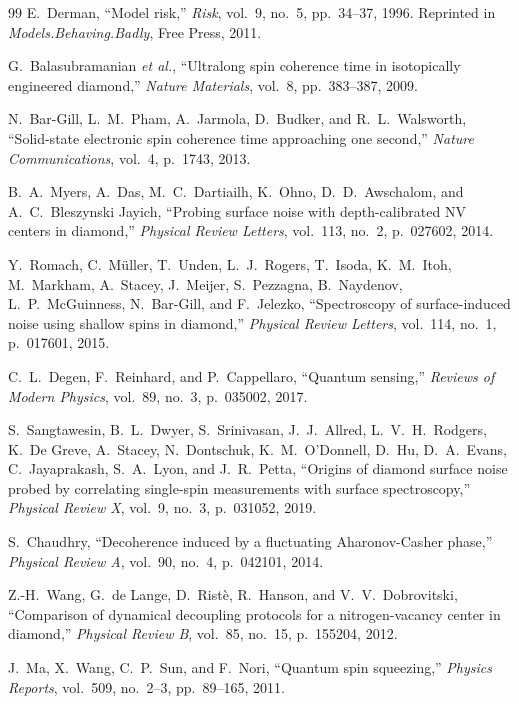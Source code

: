 \documentclass[11pt,a4paper]{article}
\theoremstyle{definition}
\begin{document}
\begin{thebibliography}{99}
E.~Derman, ``Model risk,'' \emph{Risk}, vol.~9, no.~5, pp.~34--37, 1996.
Reprinted in \emph{Models.Behaving.Badly}, Free Press, 2011.

G.~Balasubramanian \emph{et al.}, ``Ultralong spin coherence time in
isotopically engineered diamond,'' \emph{Nature Materials}, vol.~8,
pp.~383--387, 2009.

N.~Bar-Gill, L.~M.~Pham, A.~Jarmola, D.~Budker, and R.~L.~Walsworth,
``Solid-state electronic spin coherence time approaching one second,''
\emph{Nature Communications}, vol.~4, p.~1743, 2013.

B.~A.~Myers, A.~Das, M.~C.~Dartiailh, K.~Ohno, D.~D.~Awschalom, and
A.~C.~Bleszynski Jayich, ``Probing surface noise with depth-calibrated
NV centers in diamond,'' \emph{Physical Review Letters}, vol.~113,
no.~2, p.~027602, 2014.

Y.~Romach, C.~Müller, T.~Unden, L.~J.~Rogers, T.~Isoda, K.~M.~Itoh,
M.~Markham, A.~Stacey, J.~Meijer, S.~Pezzagna, B.~Naydenov,
L.~P.~McGuinness, N.~Bar-Gill, and F.~Jelezko, ``Spectroscopy of
surface-induced noise using shallow spins in diamond,''
\emph{Physical Review Letters}, vol.~114, no.~1, p.~017601, 2015.

C.~L.~Degen, F.~Reinhard, and P.~Cappellaro, ``Quantum sensing,''
\emph{Reviews of Modern Physics}, vol.~89, no.~3, p.~035002, 2017.

S.~Sangtawesin, B.~L.~Dwyer, S.~Srinivasan, J.~J.~Allred,
L.~V.~H.~Rodgers, K.~De Greve, A.~Stacey, N.~Dontschuk,
K.~M.~O'Donnell, D.~Hu, D.~A.~Evans, C.~Jayaprakash,
S.~A.~Lyon, and J.~R.~Petta, ``Origins of diamond surface noise
probed by correlating single-spin measurements with surface
spectroscopy,'' \emph{Physical Review X}, vol.~9, no.~3, p.~031052, 2019.

S.~Chaudhry, ``Decoherence induced by a fluctuating Aharonov-Casher
phase,'' \emph{Physical Review A}, vol.~90, no.~4, p.~042101, 2014.

Z.-H.~Wang, G.~de Lange, D.~Ristè, R.~Hanson, and V.~V.~Dobrovitski,
``Comparison of dynamical decoupling protocols for a nitrogen-vacancy
center in diamond,'' \emph{Physical Review B}, vol.~85, no.~15,
p.~155204, 2012.

J.~Ma, X.~Wang, C.~P.~Sun, and F.~Nori, ``Quantum spin squeezing,''
\emph{Physics Reports}, vol.~509, no.~2--3, pp.~89--165, 2011.

\end{thebibliography}
\end{document}
